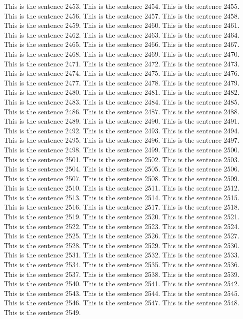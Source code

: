 \documentclass{article}
\begin{document}
This is the sentence 2453.
This is the sentence 2454.
This is the sentence 2455.
This is the sentence 2456.
This is the sentence 2457.
This is the sentence 2458.
This is the sentence 2459.
This is the sentence 2460.
This is the sentence 2461.
This is the sentence 2462.
This is the sentence 2463.
This is the sentence 2464.
This is the sentence 2465.
This is the sentence 2466.
This is the sentence 2467.
This is the sentence 2468.
This is the sentence 2469.
This is the sentence 2470.
This is the sentence 2471.
This is the sentence 2472.
This is the sentence 2473.
This is the sentence 2474.
This is the sentence 2475.
This is the sentence 2476.
This is the sentence 2477.
This is the sentence 2478.
This is the sentence 2479.
This is the sentence 2480.
This is the sentence 2481.
This is the sentence 2482.
This is the sentence 2483.
This is the sentence 2484.
This is the sentence 2485.
This is the sentence 2486.
This is the sentence 2487.
This is the sentence 2488.
This is the sentence 2489.
This is the sentence 2490.
This is the sentence 2491.
This is the sentence 2492.
This is the sentence 2493.
This is the sentence 2494.
This is the sentence 2495.
This is the sentence 2496.
This is the sentence 2497.
This is the sentence 2498.
This is the sentence 2499.
This is the sentence 2500.
This is the sentence 2501.
This is the sentence 2502.
This is the sentence 2503.
This is the sentence 2504.
This is the sentence 2505.
This is the sentence 2506.
This is the sentence 2507.
This is the sentence 2508.
This is the sentence 2509.
This is the sentence 2510.
This is the sentence 2511.
This is the sentence 2512.
This is the sentence 2513.
This is the sentence 2514.
This is the sentence 2515.
This is the sentence 2516.
This is the sentence 2517.
This is the sentence 2518.
This is the sentence 2519.
This is the sentence 2520.
This is the sentence 2521.
This is the sentence 2522.
This is the sentence 2523.
This is the sentence 2524.
This is the sentence 2525.
This is the sentence 2526.
This is the sentence 2527.
This is the sentence 2528.
This is the sentence 2529.
This is the sentence 2530.
This is the sentence 2531.
This is the sentence 2532.
This is the sentence 2533.
This is the sentence 2534.
This is the sentence 2535.
This is the sentence 2536.
This is the sentence 2537.
This is the sentence 2538.
This is the sentence 2539.
This is the sentence 2540.
This is the sentence 2541.
This is the sentence 2542.
This is the sentence 2543.
This is the sentence 2544.
This is the sentence 2545.
This is the sentence 2546.
This is the sentence 2547.
This is the sentence 2548.
This is the sentence 2549.
\end{document}
